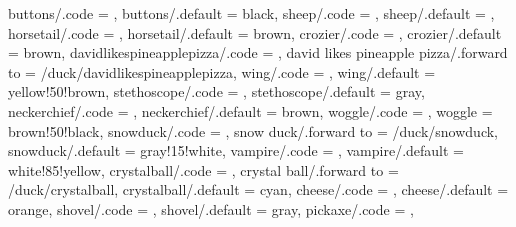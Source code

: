 {  buttons/.code             = \duck@buttonstrue     
                              \def\duck@buttons{#1},
  buttons/.default          = black,
  sheep/.code               = \duck@sheeptrue       
                              \def\duck@sheep{#1},
  sheep/.default            = \duck@body,
  horsetail/.code           = \duck@horsetailtrue   
                              \def\duck@horsetail{#1},
  horsetail/.default        = brown,
  crozier/.code             = \duck@croziertrue     
                              \def\duck@crozier{#1},
  crozier/.default          = brown,
  davidlikespineapplepizza/.code = \duck@davidlikespineapplepizzatrue
                              \duck@speechtrue 
  \def\duck@speech{\scalebox{\scalingfactor}{\scalebox{0.9}{\tiny ih, che schifo!}}},
  david likes pineapple pizza/.forward to = /duck/davidlikespineapplepizza,
  wing/.code                = \duck@wingtrue      
                              \def\duck@wing{#1},
  wing/.default             = yellow!50!brown,
  stethoscope/.code         = \duck@stethoscopetrue 
                              \def\duck@stethoscope{#1},
  stethoscope/.default      = gray,
  neckerchief/.code         = \duck@neckerchieftrue 
                              \def\duck@neckerchief{#1},
  neckerchief/.default      = brown,
  woggle/.code              = \def\duck@woggle{#1},
  woggle                    = brown!50!black,
  snowduck/.code            = \duck@snowducktrue 
                              \def\duck@snowduck{#1}
                              \def\duck@eye{#1}
                              \def\duck@body{#1}
                              \duck@tophattrue
                              \def\duck@tophat{black}
                              \duck@buttonstrue  
                              \def\duck@buttons{black},
  snow duck/.forward to     = /duck/snowduck,
  snowduck/.default         = gray!15!white,
  vampire/.code             = \duck@vampiretrue  
                              \def\duck@vampire{#1},
  vampire/.default          = white!85!yellow,
  crystalball/.code         = \duck@crystalballtrue 
                              \def\duck@crystalball{#1},
  crystal ball/.forward to  = /duck/crystalball,
  crystalball/.default      = cyan,
  cheese/.code              = \duck@cheesetrue
                              \def\duck@cheese{#1},
  cheese/.default           = orange,  
  shovel/.code              = \duck@shoveltrue
                              \def\duck@shovel{#1},
  shovel/.default           = gray,    
  pickaxe/.code             = \duck@pickaxetrue
                              \def\duck@pickaxe{#1},
}
